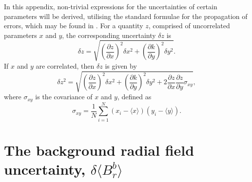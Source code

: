 \begin{appendices}
In this appendix, non-trivial expressions for the uncertainties of certain parameters will be derived, utilising the standard formulae for the propagation of errors, which may be found in \cite{Taylor}. For a quantity $z$, comprised of uncorrelated parameters $x$ and $y$, the corresponding uncertainty $\delta z$ is
%
\begin{equation}
  \delta z = \sqrt{\left(\frac{\partial z}{\partial x}\right)^{2}\delta x^{2} + \left(\frac{\partial k}{\partial y}\right)^{2}\delta y^{2}}. %
  \label{eqn:Taylor9.2}
\end{equation}
%
If $x$ and $y$ are correlated, then $\delta z$ is given by 
\begin{equation}
  \delta z^{2} = \sqrt{\left(\frac{\partial z}{\partial x}\right)^{2}\delta x^{2} + \left(\frac{\partial k}{\partial y}\right)^{2}\delta y^{2} + 2\frac{\partial z}{\partial x}\frac{\partial z}{\partial y}\sigma_{xy}},
  \label{eqn:Taylor9.9}
\end{equation}
%
where $\sigma_{xy}$ is the covariance of $x$ and $y$, defined as
%
\begin{equation}
  \sigma_{xy} = \frac{1}{N}\sum_{i=1}^{N} (x_{i}-\langle x \rangle) (y_{i}-\langle y \rangle).
\end{equation}

\section{The background radial field uncertainty, $\delta \langle B_{r}^{b} \rangle$}\label{app:Brb}


\end{appendices}
